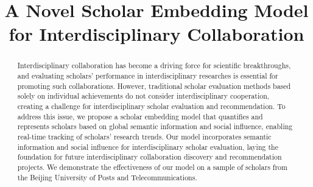 \documentclass[conference]{IEEEtran}
\begin{document}
%
\title{A Novel Scholar Embedding Model for Interdisciplinary Collaboration}



\author{
}

\maketitle


\begin{abstract}
Interdisciplinary collaboration has become a driving force for scientific breakthroughs, and evaluating scholars' performance in interdisciplinary researches is essential for promoting such collaborations. However, traditional scholar evaluation methods based solely on individual achievements do not consider interdisciplinary cooperation, creating a challenge for interdisciplinary scholar evaluation and recommendation. To address this issue, we propose a scholar embedding model that quantifies and represents scholars based on global semantic information and social influence, enabling real-time tracking of scholars' research trends. Our model incorporates semantic information and social influence for interdisciplinary scholar evaluation, laying the foundation for future interdisciplinary collaboration discovery and recommendation projects. We demonstrate the effectiveness of our model on a sample of scholars from the Beijing University of Posts and Telecommunications.
\end{abstract}
\end{document}
